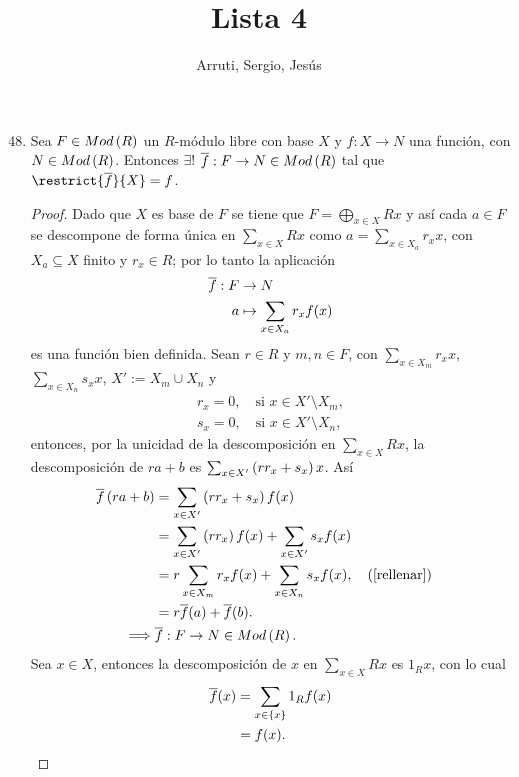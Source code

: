 \documentclass{article}
\title{Lista 4}
\author{Arruti, Sergio, Jesús}
\date{}
\begin{document}
	\maketitle
	\begin{enumerate}[label=\textbf{Ej \arabic*.}]
		\setcounter{enumi}{47}
		\item Sea $F\in Mod\left(R\right)$ un $R$-módulo libre con base $X$ y $f:X\to N$ una función, con $N\in Mod\left(R\right)$. Entonces $\exists !$ $\overline{f}:F\to N\in Mod\left(R\right)$ tal que $\restrict{\overline{f}}{X}=f$.
		\begin{proof}
			Dado que $X$ es base de $F$ se tiene que $F=\bigoplus_{x\in X}R x$ y así cada $a\in F$ se descompone de forma única en $\sum\limits_{x\in X}R x$ como $a=\sum\limits_{x\in X_a}r_x x$, con $X_a\subseteq X$ finito y $r_x\in R$; por lo tanto la aplicación
			\begin{align*}
				\overline{f}: F &\rightarrow N\\ a &\mapsto \sum\limits_{x\in X_a}r_x f(x)
			\end{align*}
			es una función bien definida. Sean $r\in R$ y $m, n\in F$, con $\sum\limits_{x\in X_m}r_x x$, $\sum\limits_{x\in X_n}s_x x$, $X':=X_m \cup X_n$ y
			\begin{equation*}\label{rellenar}\tag{*}
				\begin{split}
					r_x=0,\quad\text{si }x\in X'\setminus X_m,\\
					s_x=0,\quad\text{si }x\in X'\setminus X_n,
				\end{split}
			\end{equation*}
			entonces, por la unicidad de la descomposición en $\sum\limits_{x\in X}R x$, la descomposición de $ra+b$ es $\sum_{x\in X'}\left(rr_x +s_x\right)x$. Así
			\begin{align*}
				\overline{f}\left(ra+b\right)&=\sum_{x\in X'}\left(rr_x +s_x\right)f(x)\\
				&=\sum_{x\in X'}\left(rr_x\right)f(x)+\sum_{x\in X'}s_x f(x)\\
				&=r\sum_{x\in X_m}r_x f(x)+\sum_{x\in X_n}s_x f(x), && \left(\ref{rellenar}\right)\\
				&=r\overline{f}(a)+\overline{f}(b).\\
				\implies & \overline{f}:F\to N \in Mod\left(R\right).
			\end{align*}
			Sea $x\in X$, entonces la descomposición de $x$ en $\sum_{x\in X}R x$ es $1_Rx$, con lo cual 
			\begin{align*}
				\overline{f}(x)&=\sum_{x\in \lrbrack{x}}1_R f(x)\\
				&=f(x).\\

\end{align*}
\end{proof}
\end{enumerate}
\end{document}
